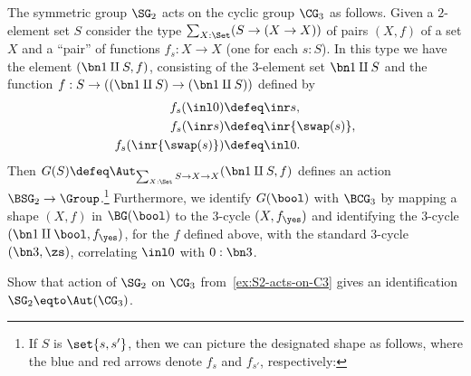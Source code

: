 \begin{example}\label{ex:S2-acts-on-C3}
  The symmetric group $\SG_2$ acts on the cyclic group $\CG_3$ as follows.
  Given a $2$-element set $S$ consider the
  type $\sum_{X:\Set}(S \to (X\to X))$ of pairs $(X,f)$ of a set $X$
  and a ``pair'' of functions $f_s:X\to X$ (one for each $s:S$).
  In this type we have the element $(\bn 1 \amalg S,f)$,
  consisting of the $3$-element set $\bn 1 \amalg S$ and the function
  $f:S \to ((\bn 1 \amalg S)\to (\bn 1 \amalg S))$ defined by
  \begin{align*}
    f_s(\inl 0)     &\defeq \inr s,\\
    f_s(\inr s)        &\defeq \inr{\swap(s)},\\
    f_s(\inr{\swap(s)}) &\defeq \inl 0.
  \end{align*}
  Then $G(S) \defeq \Aut_{\sum_{X:\Set}S\to X\to X}(\bn1\amalg S,f)$ defines an action
  $\BSG_2 \to \Group$.\footnote{%
    If $S$ is $\set{s,s'}$, then we can picture the
    designated shape as follows,
    where the blue and red arrows denote $f_s$ and $f_{s'}$,
    respectively:\par
    }
  Furthermore, we identify $G(\bool)$ with $\BCG_3$ by mapping
  a shape $(X,f)$ in $\BG(\bool)$ to the $3$-cycle $(X,f_\yes)$
  and identifying the $3$-cycle $(\bn1\amalg\bool,f_\yes)$, for the $f$ defined above,
  with the standard $3$-cycle $(\bn3,\zs)$, correlating $\inl 0$ with $0:\bn 3$.
\end{example}
\begin{xca}\label{xca:AutC3}
  Show that action of $\SG_2$ on $\CG_3$ from~\cref{ex:S2-acts-on-C3}
  gives an identification $\SG_2 \eqto \Aut(\CG_3)$.
\end{xca}

